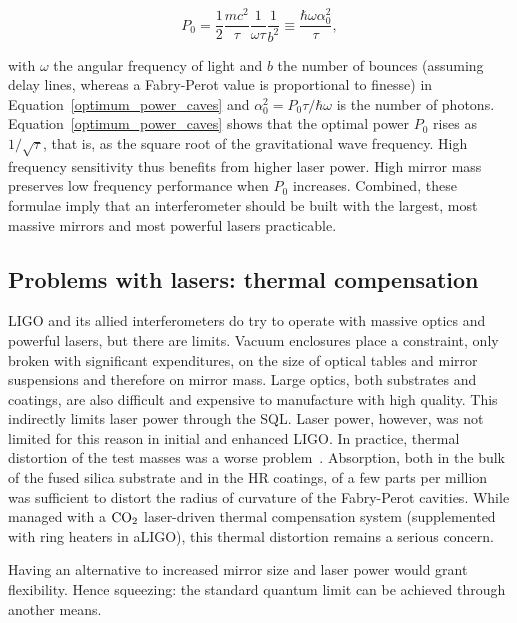 \begin{equation}
P_0 = \frac{1}{2} \frac{mc^2}{\tau}\frac{1}{\omega \tau} \frac{1}{b^2} \equiv \frac{\hbar \omega \alpha_0^2}{\tau},
\label{optimum_power_caves}
\end{equation}

\noindent with $\omega$ the angular frequency of light and $b$ the number of bounces (assuming delay lines, whereas a Fabry-Perot value is proportional to finesse) in Equation~\ref{optimum_power_caves} and $\alpha_0^2 = P_0 \tau / \hbar \omega$ is the number of photons.
Equation~\ref{optimum_power_caves} shows that the optimal power $P_0$ rises as $1/\sqrt{\tau}$, that is, as the square root of the gravitational wave frequency.
High frequency sensitivity thus benefits from higher laser power.
High mirror mass preserves low frequency performance when $P_0$ increases.
Combined, these formulae imply that an interferometer should be built with the largest, most massive mirrors and most powerful lasers practicable.

        \subsection{Problems with lasers: thermal compensation}
        \label{TCS}


LIGO and its allied interferometers do try to operate with massive optics and powerful lasers, but there are limits.
Vacuum enclosures place a constraint, only broken with significant expenditures, on the size of optical tables and mirror suspensions and therefore on mirror mass.
Large optics, both substrates and coatings, are also difficult and expensive to manufacture with high quality.
This indirectly limits laser power through the SQL.
Laser power, however, was not limited for this reason in initial and enhanced LIGO.
In practice, thermal distortion of the test masses was a worse problem~\cite{BallmerThesis}.
Absorption, both in the bulk of the fused silica substrate and in the HR coatings, of a few parts per million was sufficient to distort the radius of curvature of the Fabry-Perot cavities.
While managed with a $\textup{CO}_2$ laser-driven thermal compensation system (supplemented with ring heaters in aLIGO), this thermal distortion remains a serious concern.

Having an alternative to increased mirror size and laser power would grant flexibility.
Hence squeezing: the standard quantum limit can be achieved through another means.


